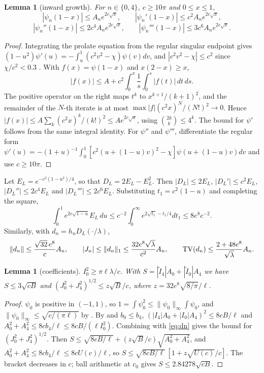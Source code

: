 \documentclass[11pt]{amsart}
\newtheorem{lemma}[proposition]{Lemma}
\theoremstyle{remark}
\numberwithin{equation}{section}
\begin{document}
\begin{lemma}[inward growth]\label{lem:volterra}
For $n\in\{0,4\}$, $c\ge10\pi$ and $0\le x\le1$,
\[
|\psi_n(1-x)|\le A_ne^{2c\sqrt x},\qquad|\psi_n'(1-x)|\le c^2A_ne^{2c\sqrt x},
\]
\[
|\psi_n''(1-x)|\le2c^4A_ne^{2c\sqrt x},\qquad|\psi_n'''(1-x)|\le3c^6A_ne^{2c\sqrt x}.
\]
\end{lemma}
\begin{proof}
Integrating the prolate equation from the regular singular endpoint gives $(1-u^2)\psi'(u)=-\int_u^1(c^2v^2-\chi)\psi(v)dv$, and $|c^2v^2-\chi|\le c^2$ since $\chi/c^2<0.3$ \cite[Lemma~3.2]{MoriWeilII}. With $f(x)=\psi(1-x)$ and $x(2-x)\ge x$,
\[
|f(x)|\le A+c^2\int_0^x\frac1s\int_0^s|f(t)|\,dt\,ds.
\]
The positive operator on the right maps $t^k$ to $x^{k+1}/(k+1)^2$, and the remainder of the $N$-th iterate is at most $\max|f|(c^2x)^N/(N!)^2\to0$. Hence $|f(x)|\le A\sum_k(c^2x)^k/(k!)^2\le Ae^{2c\sqrt x}$, using $\binom{2k}k\le4^k$. The bound for $\psi'$ follows from the same integral identity. For $\psi''$ and $\psi'''$, differentiate the regular form $\psi'(u)=-(1+u)^{-1}\int_0^1[c^2(u+(1-u)v)^2-\chi]\psi(u+(1-u)v)dv$ and use $c\ge10\pi$.
\end{proof}

Let $E_L=e^{-c^2(1-u^2)/4}$, so that $D_L=2E_L-E_L^2$. Then $|D_L|\le2E_L$, $|D_L'|\le c^2E_L$, $|D_L''|\le2c^4E_L$ and $|D_L'''|\le2c^6E_L$. Substituting $t_1=c^2(1-u)$ and completing the square,
\begin{equation}\label{eq:layerint}
\int_0^1e^{2c\sqrt{1-u}}E_L\,du\le c^{-2}\int_0^\infty e^{2\sqrt{t_1}-t_1/4}dt_1\le8e^8c^{-2}.
\end{equation}
Similarly, with $d_n=h_nD_L(\cdot/\lambda)$,
\begin{equation}\label{eq:dn}
\|d_n\|\le\frac{\sqrt{32}\,e^8}{c}A_n,\qquad|J_n|\le\|d_n\|_1\le\frac{32e^8\sqrt\lambda}{c^2}A_n,\qquad
{\rm TV}(d_n)\le\frac{2+48e^8}{\sqrt\lambda}A_n.
\end{equation}

\begin{lemma}[coefficients]\label{lem:coef}
$I_0^2\ge\pi\ell\lambda/c$. With $S=|\tilde I_4|A_0+|\tilde I_0|A_4$ we have $S\le3\sqrt{cB}$ and $(J_0^2+J_4^2)^{1/2}\le z\sqrt B/c$, where $z=32e^8\sqrt{8/\pi}/\ell$.
\end{lemma}
\begin{proof}
$\psi_0$ is positive in $(-1,1)$, so $1=\int\psi_0^2\le\|\psi_0\|_\infty\int\psi_0$, and $\|\psi_0\|_\infty\le\sqrt{c/(\pi\ell)}$ by \cite[Lemma~3.1]{MoriWeilII}. By \cite[Lemma~3.3]{MoriWeilII} and $b_0\le b_4$, $(|I_4|A_0+|I_0|A_4)^2\le8cB/\ell$ and $A_0^2+A_4^2\le8cb_4/\ell\le8cB/(\ell I_0^2)$. Combining with \eqref{eq:dn} gives the bound for $(J_0^2+J_4^2)^{1/2}$. Then $S\le\sqrt{8cB/\ell}+(z\sqrt B/c)\sqrt{A_0^2+A_4^2}$, and $A_0^2+A_4^2\le8cb_4/\ell\le8cU(c)/\ell$, so $S\le\sqrt{8cB/\ell}\,[1+z\sqrt{U(c)}/c]$. The bracket decreases in $c$; ball arithmetic at $c_0$ gives $S\le2.84278\sqrt{cB}$.
\end{proof}
\end{document}
